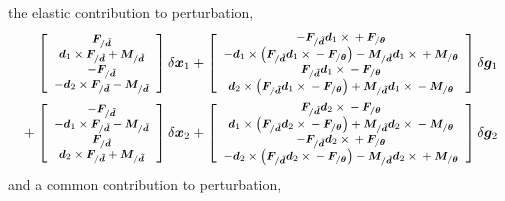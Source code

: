\documentclass[10pt,dvips,fleqn,subeqn]{report}
\newcommand{\T}[1]{\bm{#1}}
\begin{document}
%
%
%
the elastic contribution to perturbation,
\begin{align}
	\footnotesize
	\sqbr{\cvvect{
		\T{F}_{/\tilde{\T{d}}} \\
		\T{d}_1 \times \T{F}_{/\tilde{\T{d}}}
			+ \T{M}_{/\tilde{\T{d}}} \\
		- \T{F}_{/\tilde{\T{d}}} \\
		- \T{d}_2 \times \T{F}_{/\tilde{\T{d}}} 
			- \T{M}_{/\tilde{\T{d}}}
	}} \delta\T{x}_1
%
	+ \sqbr{\cvvect{
		- \T{F}_{/\tilde{\T{d}}} \T{d}_1 \times{}
			+ \T{F}_{/\T{\theta}} \\
		- \T{d}_1 \times \plbr{
			\T{F}_{/\tilde{\T{d}}} \T{d}_1 \times{}
			- \T{F}_{/\T{\theta}}
		}
			- \T{M}_{/\tilde{\T{d}}} \T{d}_1\times{}
			+ \T{M}_{/\T{\theta}} \\
		\T{F}_{/\tilde{\T{d}}} \T{d}_1 \times{}
			- \T{F}_{/\T{\theta}} \\
		\T{d}_2 \times \plbr{
			\T{F}_{/\tilde{\T{d}}} \T{d}_1 \times{}
			- \T{F}_{/\T{\theta}}
		}
			+ \T{M}_{/\tilde{\T{d}}} \T{d}_1\times{}
			- \T{M}_{/\T{\theta}}
	}} \delta\T{g}_1
	& \nonumber \\
%
	\footnotesize
	\mbox{} 
	+ \sqbr{\cvvect{
		- \T{F}_{/\tilde{\T{d}}} \\
		- \T{d}_1 \times \T{F}_{/\tilde{\T{d}}}
			- \T{M}_{/\tilde{\T{d}}} \\
		\T{F}_{/\tilde{\T{d}}} \\
		\T{d}_2 \times \T{F}_{/\tilde{\T{d}}}
			+ \T{M}_{/\tilde{\T{d}}}
	}} \delta\T{x}_2
%
	+ \sqbr{\cvvect{
		\T{F}_{/\tilde{\T{d}}} \T{d}_2 \times{}
			- \T{F}_{/\T{\theta}} \\
		\T{d}_1 \times \plbr{
			\T{F}_{/\tilde{\T{d}}} \T{d}_2 \times{}
			- \T{F}_{/\T{\theta}}
		}
			+ \T{M}_{/\tilde{\T{d}}} \T{d}_2\times{}
			- \T{M}_{/\T{\theta}} \\
		- \T{F}_{/\tilde{\T{d}}} \T{d}_2 \times{}
			+ \T{F}_{/\T{\theta}} \\
		- \T{d}_2 \times \plbr{
			\T{F}_{/\tilde{\T{d}}} \T{d}_2 \times{}
			- \T{F}_{/\T{\theta}}
		}
			- \T{M}_{/\tilde{\T{d}}} \T{d}_2\times{}
			+ \T{M}_{/\T{\theta}}
	}} \delta\T{g}_2
	&
	\label{eq:deformable-joint-perturb-elastic}
\end{align}
%
%
%
and a common contribution to perturbation,
\end{document}
